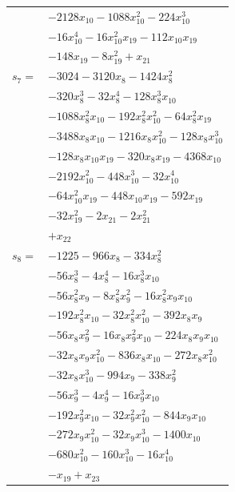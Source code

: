 \begin{longtable}{@{}r@{\;}l@{}}
 & \(\displaystyle -2128x_{10} -1088x_{10}^{2} -224x_{10}^{3}\) \\
 & \(\displaystyle -16x_{10}^{4} -16x_{10}^{2}x_{19} -112x_{10}x_{19}\) \\
 & \(\displaystyle -148x_{19} -8x_{19}^{2} +x_{21}\) \\[3pt]
\(s_{7}=\) & \(\displaystyle -3024 -3120x_{8} -1424x_{8}^{2}\) \\
 & \(\displaystyle -320x_{8}^{3} -32x_{8}^{4} -128x_{8}^{3}x_{10}\) \\
 & \(\displaystyle -1088x_{8}^{2}x_{10} -192x_{8}^{2}x_{10}^{2} -64x_{8}^{2}x_{19}\) \\
 & \(\displaystyle -3488x_{8}x_{10} -1216x_{8}x_{10}^{2} -128x_{8}x_{10}^{3}\) \\
 & \(\displaystyle -128x_{8}x_{10}x_{19} -320x_{8}x_{19} -4368x_{10}\) \\
 & \(\displaystyle -2192x_{10}^{2} -448x_{10}^{3} -32x_{10}^{4}\) \\
 & \(\displaystyle -64x_{10}^{2}x_{19} -448x_{10}x_{19} -592x_{19}\) \\
 & \(\displaystyle -32x_{19}^{2} -2x_{21} -2x_{21}^{2}\) \\
 & \(\displaystyle +x_{22}\) \\[3pt]
\(s_{8}=\) & \(\displaystyle -1225 -966x_{8} -334x_{8}^{2}\) \\
 & \(\displaystyle -56x_{8}^{3} -4x_{8}^{4} -16x_{8}^{3}x_{10}\) \\
 & \(\displaystyle -56x_{8}^{2}x_{9} -8x_{8}^{2}x_{9}^{2} -16x_{8}^{2}x_{9}x_{10}\) \\
 & \(\displaystyle -192x_{8}^{2}x_{10} -32x_{8}^{2}x_{10}^{2} -392x_{8}x_{9}\) \\
 & \(\displaystyle -56x_{8}x_{9}^{2} -16x_{8}x_{9}^{2}x_{10} -224x_{8}x_{9}x_{10}\) \\
 & \(\displaystyle -32x_{8}x_{9}x_{10}^{2} -836x_{8}x_{10} -272x_{8}x_{10}^{2}\) \\
 & \(\displaystyle -32x_{8}x_{10}^{3} -994x_{9} -338x_{9}^{2}\) \\
 & \(\displaystyle -56x_{9}^{3} -4x_{9}^{4} -16x_{9}^{3}x_{10}\) \\
 & \(\displaystyle -192x_{9}^{2}x_{10} -32x_{9}^{2}x_{10}^{2} -844x_{9}x_{10}\) \\
 & \(\displaystyle -272x_{9}x_{10}^{2} -32x_{9}x_{10}^{3} -1400x_{10}\) \\
 & \(\displaystyle -680x_{10}^{2} -160x_{10}^{3} -16x_{10}^{4}\) \\
 & \(\displaystyle -x_{19} +x_{23}\) \\[3pt]

\end{longtable}
